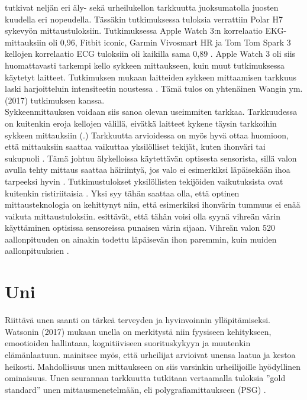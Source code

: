\documentclass[utf8,bachelor,finnish]{bachelor}
\begin{document}
  \textcite{pasadyn_accuracy_2019} tutkivat neljän eri äly- sekä urheilukellon tarkkuutta juoksumatolla juosten kuudella eri nopeudella. Tässäkin tutkimuksessa tuloksia verrattiin
   Polar H7 sykevyön mittaustuloksiin. Tutkimuksessa Apple Watch 3:n korrelaatio EKG-mittauksiin oli 0,96, Fitbit iconic, Garmin Vivosmart HR ja Tom Tom Spark 3
    kellojen korrelaatio ECG tuloksiin oli kaikilla sama 0,89 \parencite{pasadyn_accuracy_2019}. Apple Watch 3 oli siis huomattavasti tarkempi kello sykkeen mittaukseen,
     kuin muut tutkimuksessa käytetyt laitteet. Tutkimuksen mukaan laitteiden sykkeen mittaamisen tarkkuus laski
      harjoitteluin intensiteetin noustessa \parencite{pasadyn_accuracy_2019}. Tämä tulos on yhtenäinen Wangin ym. (2017) tutkimuksen kanssa.\\
  
  
   Sykkeenmittauksen voidaan siis sanoa olevan useimmiten tarkkaa.
    Tarkkuudessa on kuitenkin eroja kellojen välillä, eivätkä laitteet kykene täysin tarkkoihin sykkeen mittauksiin
     (\cite{pasadyn_accuracy_2019,wang_accuracy_2017,nelson_accuracy_2019}.) Tarkkuutta arvioidessa on myös hyvä ottaa huomioon, että mittauksiin saattaa vaikuttaa
      yksilölliset tekijät, kuten ihonväri tai sukupuoli \parencite{shcherbina_accuracy_2017,hochstadt_continuous_2020}. Tämä johtuu älykelloissa käytettävän optisesta sensorista,
       sillä valon avulla tehty mittaus saattaa häiriintyä, jos valo ei esimerkiksi läpäisekään ihoa tarpeeksi hyvin \parencite{koerber_accuracy_2022}.
       Tutkimustulokset yksilöllisten tekijöiden vaikutuksista ovat kuitenkin ristiriitaisia \parencite{koerber_accuracy_2022, pasadyn_accuracy_2019}.
        Yksi syy tähän saattaa olla, että optinen mittausteknologia on kehittynyt niin, että esimerkiksi ihonvärin tummuus ei enää vaikuta mittaustuloksiin.
         \textcite{koerber_accuracy_2022} esittävät, että tähän voisi olla syynä vihreän värin käyttäminen optisissa sensoreissa punaisen värin sijaan.
          Vihreän valon 520 aallonpituuden on ainakin todettu läpäisevän ihon paremmin, kuin muiden aallonpituuksien \parencite{fallow_influence_2013}.
        
       

  \section{Uni}
  Riittävä unen saanti on tärkeä terveyden ja hyvinvoinnin ylläpitämiseksi. Watsonin (2017) mukaan unella on merkitystä niin fyysiseen kehitykseen,
   emootioiden hallintaan, kognitiiviseen suorituskykyyn ja muutenkin elämänlaatuun. 
    \textcite{watson_sleep_2017} mainitsee myös, että urheilijat arvioivat unensa laatua ja kestoa heikosti. Mahdollisuus unen mittaukseen
     on siis varsinkin urheilijoille hyödyllinen ominaisuus. Unen seurannan tarkkuutta tutkitaan vertaamalla tuloksia ''gold standard''
      unen mittausmenetelmään, eli polygrafiamittaukseen (PSG) \parencite{de_zambotti_measures_2016, rundo_chapter_2019, miller_validation_2022}.\\
  
\end{document}
